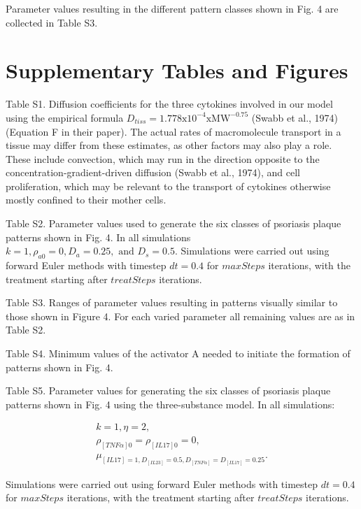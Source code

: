 Parameter values resulting in the different pattern classes shown in Fig. 4 are collected in Table S3.

\section{Supplementary Tables and Figures}
Table S1. Diffusion coefficients for the three cytokines involved in our model using the empirical formula $D_{tiss}=1.778\text{x}10^{-4}\text{xMW}^{-0.75}$ (Swabb et al., 1974) (Equation F in their paper). The actual rates of macromolecule transport in a tissue may differ from these estimates, as other factors may also play a role.  These include  convection, which may run in the direction opposite to the concentration-gradient-driven diffusion (Swabb et al., 1974), and cell proliferation, which may be relevant to the transport of cytokines otherwise mostly confined to their mother cells.

Table S2. Parameter values used to generate the six classes of psoriasis plaque patterns shown in Fig. 4. In all simulations $k=1, \rho_{a0}=0, D_a=0.25, \text{ and } D_s=0.5$.  Simulations were carried out using forward Euler methods with timestep $dt=0.4$ for $maxSteps$ iterations, with the treatment starting after $treatSteps$ iterations.

Table S3. Ranges of parameter values resulting in patterns visually similar to those shown in Figure 4. For each varied parameter all remaining values are as in Table S2.

Table S4. Minimum values of the activator A needed to initiate the formation of patterns shown in Fig. 4.

Table S5. Parameter values for generating the six classes of psoriasis plaque patterns shown in Fig. 4 using the three-substance model. In all simulations:

\begin{equation}
\begin{aligned}
k = 1, \eta = 2, \\
\rho_{[TNF\alpha]0} = \rho_{[IL17]0} = 0, \\
\mu_{[IL17] = 1, D_{[IL23]} = 0.5, D_{[TNF\alpha]} = D_{[IL17]} = 0.25}. 
\end{aligned}
\end{equation}

Simulations were carried out using forward Euler methods with timestep $dt = 0.4$ for $maxSteps$ iterations, with the treatment starting after $treatSteps$ iterations.

